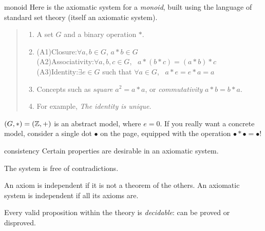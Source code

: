 \begin{example}{}{monoid}
	Here is the axiomatic system for a \emph{monoid}, built using the language of standard set theory (itself an axiomatic system).\vspace{-2pt}
	\begin{quote}
		\begin{enumerate}\itemsep2pt
		  \item A set $G$ and a binary operation $\ast$.
		  \item (A1)\lstsp Closure:\quad $\forall a,b\in G$, $a\ast b\in G$\\
	  	\lstsp(A2)\lstsp Associativity:\quad $\forall a,b,c\in G$, \ $a\ast(b\ast c)=(a\ast b)\ast c$\\
	  	\lstsp(A3)\lstsp Identity:\quad $\exists e\in G$ such that $\forall a\in G$, \ $a\ast e=e\ast a=a$
		  \item Concepts such as \emph{square} $a^2=a\ast a$, or \emph{commutativity} $a\ast b=b\ast a$.
		  \item For example, \emph{The identity is unique.}
		\end{enumerate}
	\end{quote}
	$(G,*)=(\mathbb{Z},+)$ is an abstract model, where $e=0$. If you really want a concrete model, consider a single dot $\bullet$ on the page, equipped with the operation $\bullet *\bullet =\bullet$!
\end{example}


\goodbreak



\begin{defn}{}{consistency}
	Certain properties are desirable in an axiomatic system.\vspace{-2pt}
	\begin{description}\itemsep2pt
		\item[\normalfont\emph{Consistency}] The system is free of contradictions.
		\item[\normalfont\emph{Independence}] An axiom is independent if it is not a theorem of the others. An axiomatic system is independent if all its axioms are. 
		\item[\normalfont\emph{Completeness}] Every valid proposition within the theory is \emph{decidable}: can be proved or disproved.
	\end{description}
\end{defn}

